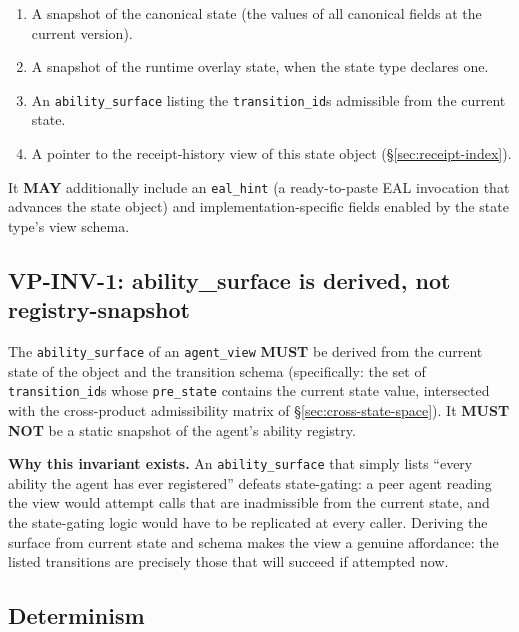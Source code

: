 \documentclass[11pt,a4paper]{article}
\theoremstyle{definition}
\begin{document}
\begin{enumerate}[leftmargin=2em,itemsep=0.25em]
    \item A snapshot of the canonical state (the values of all
    canonical fields at the current version).
    \item A snapshot of the runtime overlay state, when the
    state type declares one.
    \item An \texttt{ability\_surface} listing the
    \texttt{transition\_id}s admissible from the current state.
    \item A pointer to the receipt-history view of this state
    object (\S\ref{sec:receipt-index}).
\end{enumerate}

It \textbf{MAY} additionally include an \texttt{eal\_hint} (a
ready-to-paste EAL invocation that advances the state object) and
implementation-specific fields enabled by the state type's view
schema.

\subsection{VP-INV-1: ability\_surface is derived, not registry-snapshot}

\begin{invariant}[VP-INV-1]
The \texttt{ability\_surface} of an \texttt{agent\_view}
\textbf{MUST} be derived from the current state of the object and
the transition schema (specifically: the set of
\texttt{transition\_id}s whose \texttt{pre\_state} contains the
current state value, intersected with the cross-product
admissibility matrix of \S\ref{sec:cross-state-space}). It
\textbf{MUST NOT} be a static snapshot of the agent's ability
registry.
\end{invariant}

\textbf{Why this invariant exists.} An \texttt{ability\_surface}
that simply lists ``every ability the agent has ever registered''
defeats state-gating: a peer agent reading the view would attempt
calls that are inadmissible from the current state, and the
state-gating logic would have to be replicated at every caller.
Deriving the surface from current state and schema makes the view
a genuine affordance: the listed transitions are precisely those
that will succeed if attempted now.

\subsection{Determinism}
\end{document}
